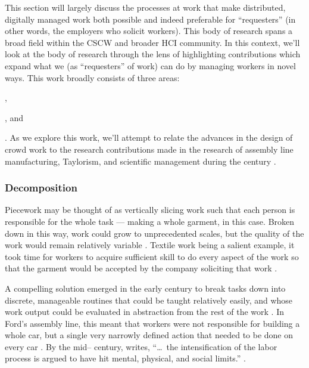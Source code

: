 \documentclass{sigchi}
\begin{document}
This section will largely discuss the processes at work that make distributed,
digitally managed work both possible and indeed preferable for ``requesters''
(in other words, the employers who solicit workers).
This body of research spans a broad field
within the CSCW and broader HCI community.
In this context,
we'll look at the body of research through the lens of
highlighting contributions which expand what we
(as ``requesters'' of work) can do by managing workers in novel ways.
This work broadly consists of three areas:
\begin{inlinelist}
\item {},
\item {}, and
\item {}
\end{inlinelist}.
As we explore this work, we'll
attempt to relate the advances in the design of crowd work to
the research contributions made in the research of assembly line manufacturing,
Taylorism, and
scientific management 
during the  century
\cite{hu1961parallel}.


\subsubsection{Decomposition}\label{sec:decomposition}
Piecework may be thought of as vertically slicing work such that 
each person is responsible for the whole task
--- making a whole garment, in this case.
Broken down in this way, work could grow to unprecedented scales,
but the quality of the work would remain relatively variable
\cite{murray1983decentralisation}.
Textile work being a salient example,
it took time for workers to acquire sufficient skill
to do every aspect of the work so that the garment would be accepted by the company soliciting that work
\cite{vezina1992light}.

A compelling solution emerged in the early  century to break tasks down into discrete,
manageable routines that could be taught relatively easily,
and whose work output could be evaluated in abstraction from the rest of the work
\cite{restructuringPieceworkBaker}.
In Ford's assembly line, this meant that workers were not responsible for building a whole car,
but a single very narrowly defined action that needed to be done on every car
\cite{towardsGlobalFordism}.
By the mid-- century, \citeauthor{schoenberger1988fordism} writes,
``\dots~the intensification of the labor process is argued to have hit mental, physical, and social limits.''
\cite{schoenberger1988fordism}.
\end{document}
